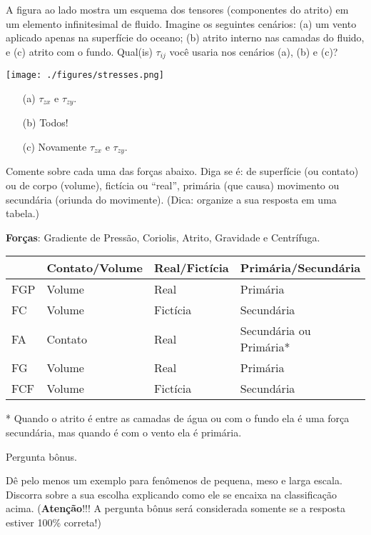 \documentclass[letterpaper,portuguese,12pt,pdftex]{exam}
\begin{document}
\begin{questions}
  \begin{minipage}[b]{0.85\linewidth}
    \question[2\half]
    A figura ao lado mostra um esquema dos tensores (componentes do atrito) em
    um elemento infinitesimal de fluido.  Imagine os seguintes cenários: (a) um
    vento aplicado apenas na superfície do oceano; (b) atrito interno nas
    camadas do fluido, e (c) atrito com o fundo.  Qual(is) $\tau_{ij}$ você
    usaria nos cenários (a), (b) e (c)?
  \end{minipage}
  \hfill
  \begin{minipage}[b]{0.35\linewidth}
    \texttt{[image: ./figures/stresses.png]}
  \end{minipage}

  \begin{solution}
    \begin{itemize}
      \item[(a)] $\tau_{zx}$ e $\tau_{zy}$.
      \item[(b)] Todos!
      \item[(c)] Novamente $\tau_{zx}$ e $\tau_{zy}$.
    \end{itemize}

  \end{solution}


  \question[5]
  Comente sobre cada uma das forças abaixo.  Diga se é: de superfície
  (ou contato) ou de corpo (volume), fictícia ou ``real'', primária (que causa)
  movimento ou secundária (oriunda do movimente). (Dica: organize a sua resposta
  em uma tabela.)

  {\bf Forças}: Gradiente de Pressão, Coriolis, Atrito, Gravidade e Centrífuga.
  \begin{solution}
    \begin{tabular}{l|l|l|l}
        & Contato/Volume & Real/Fictícia & Primária/Secundária \\
    \hline
    FGP & Volume         & Real          & Primária \\
    FC  & Volume         & Fictícia      & Secundária \\
    FA  & Contato        & Real          & Secundária ou Primária* \\
    FG  & Volume         & Real          & Primária \\
    FCF & Volume         & Fictícia      & Secundária \\
    \hline
    \end{tabular}

    * Quando o atrito é entre as camadas de água ou com o fundo ela é uma força
    secundária, mas quando é com o vento ela é primária.
  \end{solution}

  \bonusquestion[5]
  Pergunta bônus.

  Dê pelo menos um exemplo para fenômenos de pequena, meso e larga escala.
  Discorra sobre a sua escolha explicando como ele se encaixa na classificação
  acima. ({\bf Atenção}!!! A pergunta bônus será considerada somente se a
  resposta estiver 100\% correta!)

\end{questions}
\end{document}
